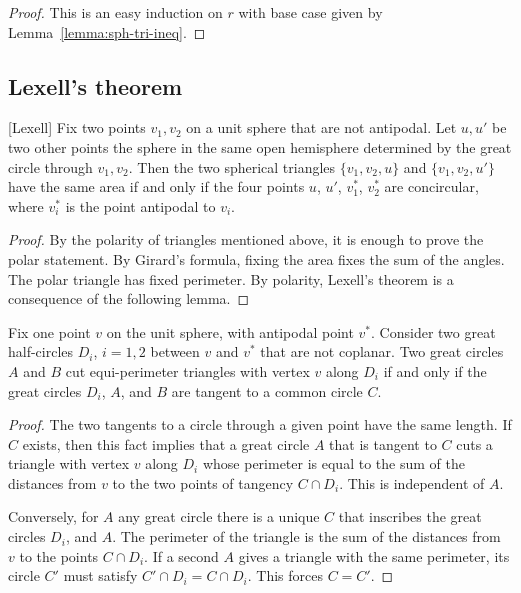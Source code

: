 \begin{proof} This is an easy induction on $r$ with base
case given by Lemma~\ref{lemma:sph-tri-ineq}.
\end{proof}

\subsection{Lexell's theorem}

\begin{lemma}[Lexell]
Fix two points $v_1,v_2$ on a unit sphere  that
are not antipodal.
Let $u,u'$ be two other points the sphere in the same open hemisphere determined by the great circle through $v_1,v_2$.  Then the two spherical triangles $\{v_1,v_2,u\}$ and $\{v_1,v_2,u'\}$ have the same area if and only if
the four points $u$, $u'$, $v^*_1$, $v^*_2$ are concircular, where $v^*_i$ is the point antipodal to $v_i$.
\end{lemma}



\begin{proof}  By the polarity of triangles mentioned above, it is enough to prove the polar statement.  By Girard's formula, fixing the area fixes the sum of the angles.  The polar triangle has fixed perimeter.  By polarity, Lexell's theorem is a consequence of the following lemma.
\end{proof}

\begin{lemma}  Fix one point $v$ on the unit sphere, with antipodal point $v^*$.  Consider two great half-circles $D_i$, $i=1,2$ between $v$ and $v^*$ that are not coplanar.  Two great circles $A$ and $B$ cut equi-perimeter triangles with vertex $v$ along $D_i$ if and only if the great circles $D_i$, $A$, and $B$ are tangent to a common circle $C$.
\end{lemma}

\begin{proof} The two tangents to a circle through a given point have the same length.  If $C$ exists, then this fact implies that a great circle $A$ that is tangent to $C$ cuts a triangle with vertex $v$ along $D_i$ whose perimeter is equal to the sum of the distances from $v$ to the two points of tangency $C\cap D_i$.  This is independent of $A$.

Conversely, for $A$ any great circle there is a unique $C$ that inscribes the great circles $D_i$, and $A$.  The perimeter of the triangle is the sum of the distances from $v$ to the points $C\cap D_i$.
If a second $A$ gives a triangle with the same perimeter, its circle $C'$
must satisfy $C'\cap D_i = C\cap D_i$.  This forces $C=C'$.
\end{proof}

